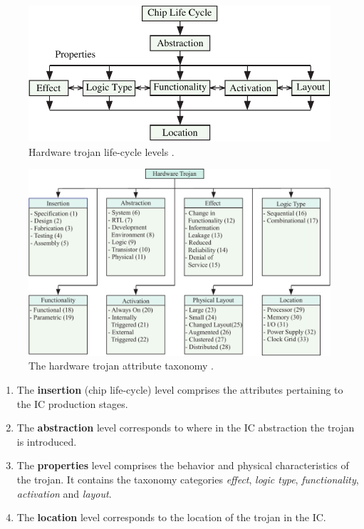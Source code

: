 \documentclass[conference]{IEEEtran}
\begin{document}
\begin{figure}[h]
	\centering
	\includegraphics[width=0.99\linewidth]{Figures/trojan_life_cycle}
	\caption{Hardware trojan life-cycle levels \cite{samerAttribute}.}
	\label{fig:trojan_life_cycle}
\end{figure}
\begin{figure}[]
	\centering
	\includegraphics[width=0.7\linewidth]{Figures/HW_trojan}
	\caption{The hardware trojan attribute taxonomy \cite{samerAttribute}.}
	\label{fig:HW_trojan}
\end{figure}
\begin{enumerate}
	\item The \textbf{insertion} (chip life-cycle) level comprises the attributes pertaining to the IC production stages.
	\item The \textbf{abstraction} level corresponds to where in the IC abstraction the trojan is introduced.
	\item The \textbf{properties} level comprises the behavior and physical characteristics of the trojan.
	It contains the taxonomy categories \textit{effect}, \textit{logic type}, \textit{functionality}, \textit{activation} and \textit{layout}.
	\item The \textbf{location} level corresponds to the location of the trojan in the IC.
\end{enumerate}
\end{document}
